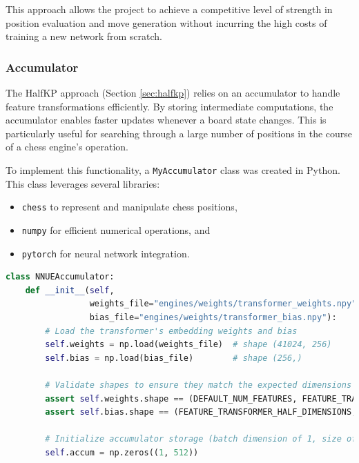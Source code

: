\documentclass[12pt,a4paper]{article}
\begin{document}
This approach allows the project to achieve a competitive level of strength in position evaluation and move generation without incurring the high costs of training a new network from scratch.

\subsubsection*{Accumulator}
The HalfKP approach (Section \ref{sec:halfkp}) relies on an accumulator to handle feature transformations efficiently. By storing intermediate computations, the accumulator enables faster updates whenever a board state changes. This is particularly useful for searching through a large number of positions in the course of a chess engine's operation.

To implement this functionality, a \texttt{MyAccumulator} class was created in Python. This class leverages several libraries:
\begin{itemize}
    \item \texttt{chess} to represent and manipulate chess positions,
    \item \texttt{numpy} for efficient numerical operations, and
    \item \texttt{pytorch} for neural network integration.
\end{itemize}

\begin{lstlisting}[language=Python, caption={Part 1: Initialization of NNUEAccumulator}, label={lst:accumulator}, basicstyle=\footnotesize\ttfamily,breaklines=true]
class NNUEAccumulator:
    def __init__(self, 
                 weights_file="engines/weights/transformer_weights.npy", 
                 bias_file="engines/weights/transformer_bias.npy"):
        # Load the transformer's embedding weights and bias
        self.weights = np.load(weights_file)  # shape (41024, 256)
        self.bias = np.load(bias_file)        # shape (256,)

        # Validate shapes to ensure they match the expected dimensions
        assert self.weights.shape == (DEFAULT_NUM_FEATURES, FEATURE_TRANSFORMER_HALF_DIMENSIONS)
        assert self.bias.shape == (FEATURE_TRANSFORMER_HALF_DIMENSIONS,)

        # Initialize accumulator storage (batch dimension of 1, size of 512)
        self.accum = np.zeros((1, 512))
\end{lstlisting}
\end{document}
